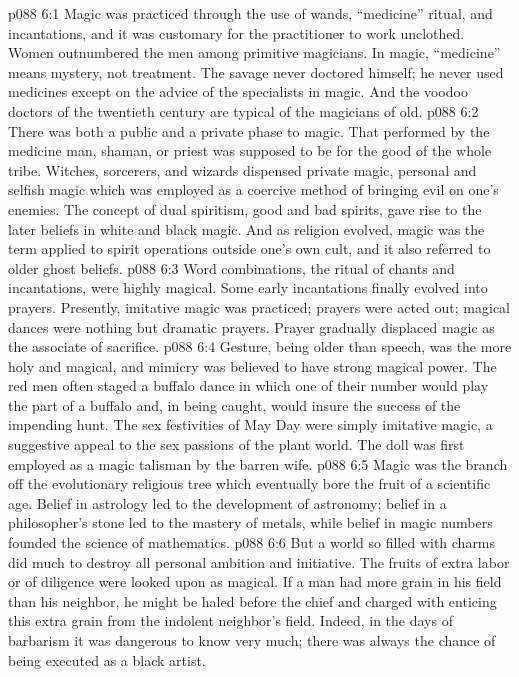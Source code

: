 \vs p088 6:1 Magic was practiced through the use of wands, “medicine” ritual, and incantations, and it was customary for the practitioner to work unclothed. Women outnumbered the men among primitive magicians. In magic, “medicine” means mystery, not treatment. The savage never doctored himself; he never used medicines except on the advice of the specialists in magic. And the voodoo doctors of the twentieth century are typical of the magicians of old.
\vs p088 6:2 There was both a public and a private phase to magic. That performed by the medicine man, shaman, or priest was supposed to be for the good of the whole tribe. Witches, sorcerers, and wizards dispensed private magic, personal and selfish magic which was employed as a coercive method of bringing evil on one’s enemies. The concept of dual spiritism, good and bad spirits, gave rise to the later beliefs in white and black magic. And as religion evolved, magic was the term applied to spirit operations outside one’s own cult, and it also referred to older ghost beliefs.
\vs p088 6:3 Word combinations, the ritual of chants and incantations, were highly magical. Some early incantations finally evolved into prayers. Presently, imitative magic was practiced; prayers were acted out; magical dances were nothing but dramatic prayers. Prayer gradually displaced magic as the associate of sacrifice.
\vs p088 6:4 Gesture, being older than speech, was the more holy and magical, and mimicry was believed to have strong magical power. The red men often staged a buffalo dance in which one of their number would play the part of a buffalo and, in being caught, would insure the success of the impending hunt. The sex festivities of May Day were simply imitative magic, a suggestive appeal to the sex passions of the plant world. The doll was first employed as a magic talisman by the barren wife.
\pc \vs p088 6:5 Magic was the branch off the evolutionary religious tree which eventually bore the fruit of a scientific age. Belief in astrology led to the development of astronomy; belief in a philosopher’s stone led to the mastery of metals, while belief in magic numbers founded the science of mathematics.
\pc \vs p088 6:6 But a world so filled with charms did much to destroy all personal ambition and initiative. The fruits of extra labor or of diligence were looked upon as magical. If a man had more grain in his field than his neighbor, he might be haled before the chief and charged with enticing this extra grain from the indolent neighbor’s field. Indeed, in the days of barbarism it was dangerous to know very much; there was always the chance of being executed as a black artist.
